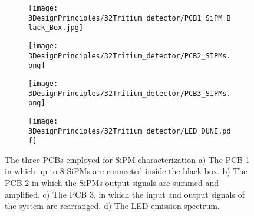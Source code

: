 \begin{figure}
\centering
    \begin{subfigure}[b]{0.5\textwidth}
    \centering
    \texttt{[image: 3DesignPrinciples/32Tritium\_detector/PCB1\_SiPM\_Black\_Box.jpg]}  
    \caption{\label{subfig:PCB1}}
    \end{subfigure}
    \hfill
    \begin{subfigure}[b]{0.45\textwidth}
    \centering
    \texttt{[image: 3DesignPrinciples/32Tritium\_detector/PCB2\_SIPMs.png]}  
    \caption{\label{subfig:PCB2}}
    \end{subfigure}
    \hfill
    \begin{subfigure}[b]{0.4\textwidth}
    \centering
    \texttt{[image: 3DesignPrinciples/32Tritium\_detector/PCB3\_SiPMs.png]}  
    \caption{\label{subfig:PCB3}}
    \end{subfigure}
    \hfill
    \begin{subfigure}[b]{0.5\textwidth}
    \centering
    \texttt{[image: 3DesignPrinciples/32Tritium\_detector/LED\_DUNE.pdf]}  
    \caption{\label{subfig:LEDSpectrum}}
    \end{subfigure}
 \caption{The three PCBs employed for SiPM characterization a) The PCB 1 in which up to 8 SiPMs are connected inside the black box. b) The PCB 2 in which the SiPMs output signals are summed and amplified. c) The PCB 3, in which the input and output signals of the system are rearranged. d) The LED emission spectrum.}
 \label{fig:PCBs_LEDSpectrum}
\end{figure}